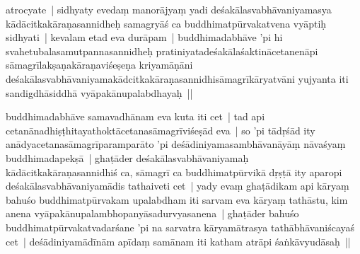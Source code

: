 \documentclass[article,12pt,a4paper]{memoir}%
\newcounter{parCount}
\begin{document}
	  
	  \pstart \leavevmode%
	\label{thakur75-41.12}atrocyate | sidhyaty evedaṃ manorājyaṃ yadi deśakālasvabhāvaniyamasya kādācitkakāraṇasannidheḥ samagryāś ca buddhimatpūrvakatvena vyāptiḥ sidhyati | kevalam etad eva durāpam | buddhimadabhāve 'pi hi svahetubalasamutpannasannidheḥ pratiniyatadeśakālaśaktinācetanenāpi sāmagrīlakṣaṇakāraṇaviśeṣeṇa kriyamāṇāni deśakālasvabhāvaniyamakādcitkakāraṇasannidhisāmagrīkāryatvāni yujyanta iti sandigdhāsiddhā vyāpakānupalabdhayaḥ ||
	{}
	\pend%
      

	  
	  \pstart \leavevmode%
	\label{thakur75-41.18}buddhimadabhāve samavadhānam eva kuta iti cet | tad api cetanānadhiṣṭhitayathoktācetanasāmagrīviśeṣād eva | so 'pi tādṛśād ity anādyacetanasāmagrīparamparāto 'pi deśādiniyamasambhāvanāyāṃ nāvaśyaṃ buddhimadapekṣā | ghaṭāder deśakālasvabhāvaniyamaḥ kādācitkakāraṇasannidhiś ca, sāmagrī ca buddhimatpūrvikā dṛṣṭā ity aparopi deśakālasvabhāvaniyamādis tathaiveti cet | yady evaṃ ghaṭādikam api kāryaṃ bahuśo buddhimatpūrvakam upalabdham iti sarvam eva kāryaṃ tathāstu, kim anena vyāpakānupalambhopanyāsadurvyasanena | ghaṭāder bahuśo buddhimatpūrvakatvadarśane 'pi na sarvatra kāryamātrasya tathābhāvaniścayaś cet | deśādiniyamādīnām apīdaṃ samānam iti katham atrāpi śaṅkāvyudāsaḥ ||
	{}
	\pend%
      
\end{document}
